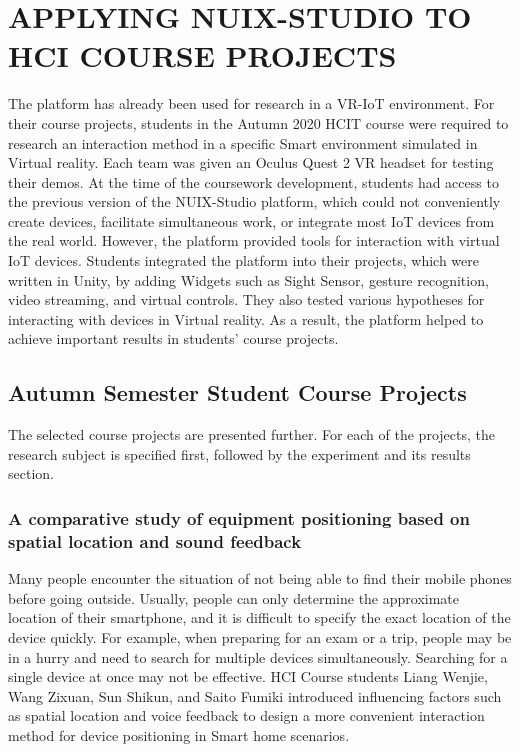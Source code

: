 
\chapter{\MakeUppercase{Applying NUIX-Studio to HCI Course Projects}}

The platform has already been used for research in a VR-IoT environment.
For their course projects, students in the Autumn 2020 HCIT course were required to research an interaction method in a specific Smart environment simulated in Virtual reality. Each team was given an Oculus Quest 2 VR headset for testing their demos. At the time of the coursework development, students had access to the previous version of the NUIX-Studio platform, which could not conveniently create devices, facilitate simultaneous work, or integrate most IoT devices from the real world. However, the platform provided tools for interaction with virtual IoT devices. Students integrated the platform into their projects, which were written in Unity, by adding Widgets such as Sight Sensor, gesture recognition, video streaming, and virtual controls. They also tested various hypotheses for interacting with devices in Virtual reality. As a result, the platform helped to achieve important results in students' course projects. 

\section{Autumn Semester Student Course Projects}

The selected course projects are presented further. For each of the projects, the research subject is specified first, followed by the experiment and its results section.


\subsection{A comparative study of equipment positioning based on spatial location and sound feedback}

Many people encounter the situation of not being able to find their mobile phones before going outside. Usually, people can only determine the approximate location of their smartphone, and it is difficult to specify the exact location of the device quickly. For example, when preparing for an exam or a trip, people may be in a hurry and need to search for multiple devices simultaneously. Searching for a single device at once may not be effective. HCI Course students Liang Wenjie, Wang Zixuan, Sun Shikun, and Saito Fumiki introduced influencing factors such as spatial location and voice feedback to design a more convenient interaction method for device positioning in Smart home scenarios. 

